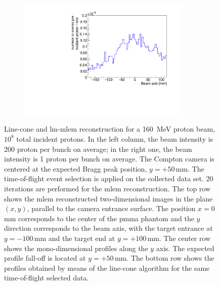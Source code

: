 \begin{figure}
\begin{subfigure}[b]{.5\textwidth}
\caption{}
\label{chap4::fig::1Drecon_LC_200p}
\end{subfigure}
\begin{subfigure}[b]{.5\textwidth}
\centering
\includegraphics[width=0.9\textwidth]{03_GraphicFiles/chapter4_HTsimu/new/recon_profile_line-cone_lowStat_norm.pdf}
\caption{}
\label{chap4::fig::1Drecon_LC_200p}
\end{subfigure}
\caption{Line-cone and \gls{lm-mlem} reconstruction for a 160~MeV proton beam, $10^{8}$ total incident protons. In the left column, the beam intensity is 200 proton per bunch on average; in the right one, the beam intensity is 1 proton per bunch on average. The Compton camera is centered at the expected Bragg peak position, $y=+50\,$mm. The time-of-flight event selection is applied on the collected data set. 20 iterations are performed for the \gls{mlem} reconstruction. The top row shows the \gls{mlem} reconstructed two-dimensional images in the plane $(x,y)$, parallel to the camera entrance surface. The position $x=0\,$mm corresponds to the center of the \gls{pmma} phantom and the $y$ direction corresponds to the beam axis, with the target entrance at $y=-100\,$mm and the target end at $y=+100\,$mm.  The center row shows the mono-dimensional profiles along the $y$ axis. The expected profile fall-off is located at $y=+50\,$mm. The bottom row shows the profiles obtained by means of the line-cone algorithm for the same time-of-flight selected data.}
\label{chap4::fig::comparison}
\end{figure}

